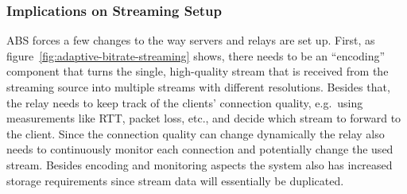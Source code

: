 \subsubsection{Implications on Streaming Setup}
ABS forces a few changes to the way servers and relays are set up.
First, as figure~\autoref{fig:adaptive-bitrate-streaming} shows, there needs to 
be an ``encoding'' component that turns the single, high-quality stream that is 
received from the streaming source into multiple streams with different resolutions.
Besides that, the relay needs to keep track of the clients' connection quality, e.g.~using 
measurements like RTT, packet loss, etc., and decide which stream to forward to the client.
Since the connection quality can change dynamically the relay also needs to continuously
monitor each connection and potentially change the used stream.
Besides encoding and monitoring aspects the system also has increased storage requirements
since stream data will essentially be duplicated.
